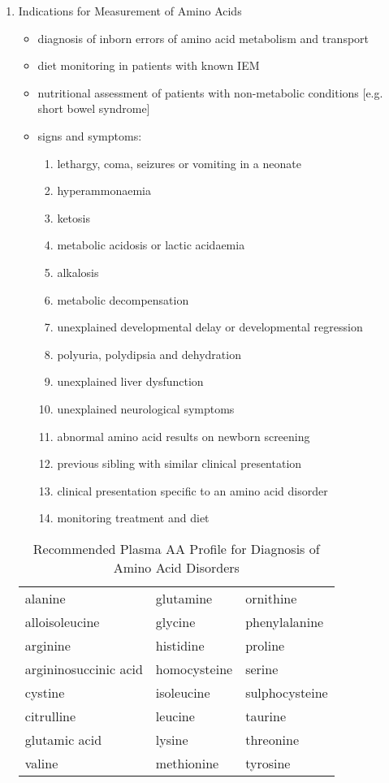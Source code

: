 \documentclass{scrartcl}
\begin{document}
\begin{enumerate}
\item Indications for Measurement of Amino Acids
\label{sec:orgb0e4a1e}
\begin{itemize}
\item diagnosis of inborn errors of amino acid metabolism and transport
\item diet monitoring in patients with known IEM
\item nutritional assessment of patients with non-metabolic conditions [e.g. short bowel syndrome]
\item signs and symptoms:
\begin{enumerate}
\item lethargy, coma, seizures or vomiting in a neonate
\item hyperammonaemia
\item ketosis
\item metabolic acidosis or lactic acidaemia
\item alkalosis
\item metabolic decompensation
\item unexplained developmental delay or developmental regression
\item polyuria, polydipsia and dehydration
\item unexplained liver dysfunction
\item unexplained neurological symptoms
\item abnormal amino acid results on newborn screening
\item previous sibling with similar clinical presentation
\item clinical presentation specific to an amino acid disorder
\item monitoring treatment and diet
\end{enumerate}
\end{itemize}

\begin{table}[htbp]
\caption{\label{tab:orgd5b399d}
Recommended Plasma AA Profile for Diagnosis of Amino Acid Disorders}
\centering
\begin{tabular}{lll}
alanine & glutamine & ornithine\\
alloisoleucine & glycine & phenylalanine\\
arginine & histidine & proline\\
argininosuccinic acid & homocysteine \footnotemark & serine\\
cystine & isoleucine & sulphocysteine \footnotemark\\
citrulline & leucine & taurine\\
glutamic acid & lysine & threonine\\
valine & methionine & tyrosine\\
\end{tabular}
\end{table}


\end{enumerate}
\end{document}
